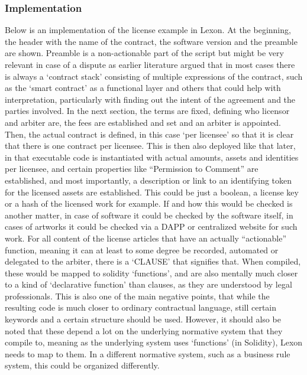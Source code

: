 \documentclass[conference]{IEEEtran}
\begin{document}
\subsubsection{Implementation}
Below is an implementation of the license example in Lexon. At the beginning, the header with the name of the contract, the software version and the preamble are shown. Preamble is a non-actionable part of the script but might be very relevant in case of a dispute as earlier literature argued that in most cases there is always a ‘contract stack’ consisting of multiple expressions of the contract, such as the ‘smart contract’ as a functional layer and others that could help with interpretation, particularly with finding out the intent of the agreement and the parties involved.
In the next section, the terms are fixed, defining who licensor and arbiter are, the fees are established and set and an arbiter is appointed. Then, the actual contract is defined, in this case ‘per licensee’ so that it is clear that there is one contract per licensee. This is then also deployed like that later, in that executable code is instantiated with actual amounts, assets and identities per licensee, and certain properties like “Permission to Comment” are established, and most importantly, a description or link to an identifying token for the licensed assets are established. This could be just a boolean, a license key or a hash of the licensed work for example. If and how this would be checked is another matter, in case of software it could be checked by the software itself, in cases of artworks it could be checked via a DAPP or centralized website for such work. For all content of the license articles that have an actually “actionable” function, meaning it can at least to some degree be recorded, automated or delegated to the arbiter, there is a ‘CLAUSE’ that signifies that. When compiled, these would be mapped to solidity ‘functions’, and are also mentally much closer to a kind of ‘declarative function’ than clauses, as they are understood by legal professionals. This is also one of the main negative points, that while the resulting code is much closer to ordinary contractual language, still certain keywords and a certain structure should be used. However, it should also be noted that these depend a lot on the underlying normative system that they compile to, meaning as the underlying system uses ‘functions’ (in Solidity), Lexon needs to map to them. In a different normative system, such as a business rule system, this could be organized differently.
\end{document}

